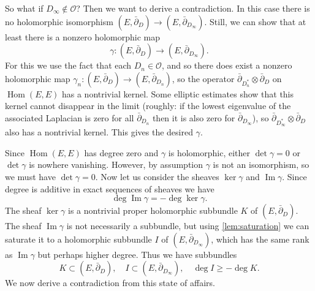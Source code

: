 \documentclass[12pt,letterpaper,reqno]{article}
\numberwithin{equation}{section}
\newcommand{\cO}{\ensuremath{\mathcal O}}
\DeclareMathOperator{\im}{Im}
\DeclareMathOperator{\Hom}{Hom}
\newcommand{\fixme}[1]{{\color{orange}{[#1]}}}
\begin{document}
\begin{pf}
So what if $D_\infty \not\in \cO$? Then we want to derive
a contradiction. \fixme{remark $D_\infty$ still defines a holomorphic
structure even though it's only $L^2_1$: from Atiyah-Bott Lemma 14.8} 
In this case there
is no holomorphic isomorphism $(E,\bar\partial_D) \to (E,\bar\partial_{D_\infty})$.
Still, we can show that at least there is a
nonzero holomorphic map
\begin{equation}
  \gamma: (E,\bar\partial_D) \to (E,\bar\partial_{D_\infty}).
\end{equation}
For this we use the fact that each $D_n \in \cO$, and so 
there does exist a nonzero holomorphic map 
$\gamma_n: (E,\bar\partial_D) \to (E,\bar\partial_{D_n})$,
so the operator
$\bar\partial_{D^*_n} \otimes \bar\partial_D$
on $\Hom(E,E)$ has a nontrivial kernel. Some elliptic estimates
show that this kernel cannot disappear in the limit (roughly:
if the lowest eigenvalue of the associated Laplacian is zero
for all $\bar\partial_{D_n}$ then it is also zero for $\bar\partial_{D_\infty}$),
so $\bar\partial_{D^*_\infty} \otimes \bar\partial_D$
 also has a nontrivial kernel.
This gives the desired $\gamma$.

Since $\Hom(E,E)$ has degree zero and $\gamma$ is holomorphic,
either $\det \gamma = 0$ or $\det \gamma$ is nowhere vanishing.
However, by assumption $\gamma$ is not an isomorphism, so we must have
$\det \gamma = 0$.
Now let us consider the sheaves $\ker \gamma$ and $\im \gamma$.
Since degree is additive in exact sequences of sheaves
we have
\begin{equation}
 \deg \im \gamma = - \deg \ker \gamma.
\end{equation}
The sheaf $\ker \gamma$ is a nontrivial proper
holomorphic subbundle $K$ of $(E,\bar\partial_D)$.
The sheaf $\im \gamma$ is not necessarily a subbundle,
but using \autoref{lem:saturation} we can saturate 
it to a holomorphic subbundle $I$ of $(E,\bar\partial_{D_\infty})$,
which has the same rank as $\im \gamma$ but perhaps higher degree.
Thus we have subbundles
\begin{equation} \label{eq:degGlF}
 K \subset (E,\bar\partial_D), \quad I \subset (E,\bar\partial_{D_\infty}), \quad  \deg I \ge - \deg K.
\end{equation}
We now derive a contradiction from this state of affairs.


\end{pf}
\end{document}
